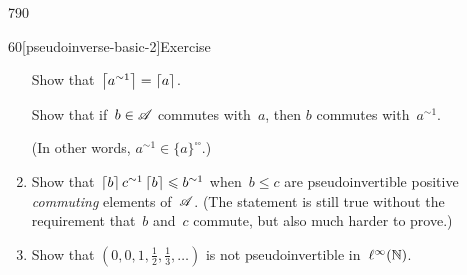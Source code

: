 \begin{parsec}{790}
\begin{point}{60}[pseudoinverse-basic-2]{Exercise}
\begin{enumerate}
Show that~$\ceil{a^{\sim1}}=\ceil{a}$.

Show that if~$b\in \scrA$ commutes with~$a$,
then $b$ commutes with~$a^{\sim 1}$.

(In other words, $a^{\sim1}\in\{a\}^{\square\square}$.)
\item
Show that~$\left\lceil b\right\rceil c^{\sim1}\left\lceil b\right\rceil\leqslant b^{\sim1}$
when~$b\leq c$ are pseudoinvertible positive \emph{commuting}
elements of~$\mathscr{A}$.
(The statement is still true without
the requirement that~$b$ and~$c$ commute,
but also much harder to prove.)


\item
Show that $(0,0,1,\frac{1}{2}, \frac{1}{3},\dotsc)$
        is not pseudoinvertible in~$\ell^\infty(\mathbb{N})$.
\end{enumerate}
\end{point}
\end{parsec}
